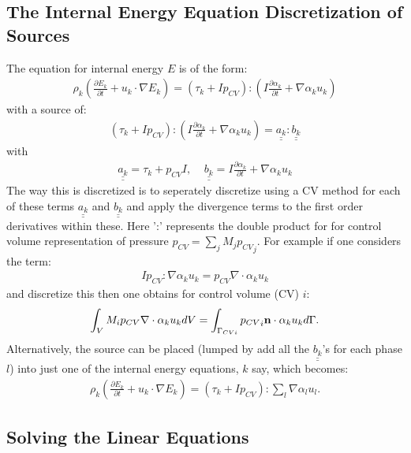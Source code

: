 \subsection{The Internal Energy Equation Discretization of Sources}
\label{thermal-sources}
The equation for internal energy $E$ is of the form:
\begin{eqnarray}
\rho_k (\frac{\partial E_k}{\partial t} + u_k\cdot\nabla E_k )
= (\tau_k + I p_{CV}):  (I\frac{\partial\alpha_k}{\partial t}+ \nabla \alpha_k u_k )
\end{eqnarray}
with a source of:
\begin{eqnarray}
(\tau_k + Ip_{CV}) :  (I\frac{\partial\alpha_k}{\partial t}+ \nabla \alpha_k u_k )= \underline{\underline {a_k}} :  \underline{\underline {b_k}}
\end{eqnarray}
with
\begin{eqnarray}
\underline{\underline {a_k}}=\tau_k + p_{CV} I,  \;\;\;\;
\underline{\underline {b_k}}=I\frac{\partial\alpha_k}{\partial t}+ \nabla \alpha_k u_k
\end{eqnarray}
The way this is discretized is to seperately discretize using a CV method
for each of these terms $\underline{\underline {a_k}}$ and $\underline{\underline {b_k}}$ and apply the divergence terms to the first order
derivatives within these. Here ':' represents the double product for for control volume
representation of pressure $p_{CV} = \sum_j M_j {p_{CV}}_j$.
For example if one considers the term:
\begin{eqnarray}
Ip_{CV} :  \nabla \alpha_k u_k = p_{CV} \nabla \cdot \alpha_k u_k
\end{eqnarray}
and discretize this then one obtains for control volume (CV) $i$:
\begin{eqnarray}
 \int_V M_i p_{CV}\nabla \cdot \alpha_k u_k dV = \int_{\Gamma_{CVi}} {p_{CV}}_i {\bf n}\cdot \alpha_k u_k d\Gamma.
\end{eqnarray}
Alternatively, the source can be placed (lumped by add all the $\underline{\underline {b_k}}$'s for each phase $l$) into just one of the internal energy equations, $k$ say, which becomes:
\begin{eqnarray}
\rho_k (\frac{\partial E_k}{\partial t} + u_k\cdot\nabla E_k )
= (\tau_k + I p_{CV}):  \sum_l \nabla \alpha_l u_l .
\end{eqnarray}



\subsection{Solving the Linear Equations}

